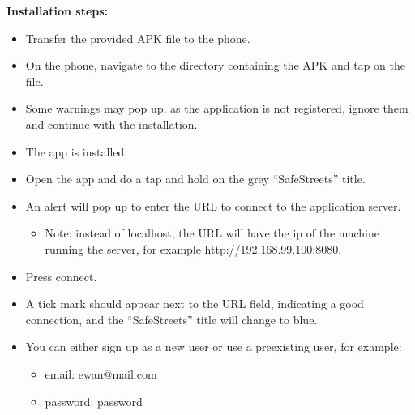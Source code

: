 \textbf{Installation steps:}
\begin{itemize}[label={\textbf{-}}]
    \item 
    Transfer the provided APK file to the phone.
    \item 
    On the phone, navigate to the directory containing the APK and tap on the file.
    \item 
    Some warnings may pop up, as the application is not registered, ignore them and continue with the installation.
    \item 
    The app is installed.
    \item 
    Open the app and do a tap and hold on the grey “SafeStreets” title.
    \item 
    An alert will pop up to enter the URL to connect to the application server.
    \begin{itemize}[label={\textbf{-}}]
        \item Note: instead of localhost, the URL will have the ip of the machine running the server, for example http://192.168.99.100:8080.
    \end{itemize}
    \item Press connect.
    \item A tick mark should appear next to the URL field, indicating a good connection, and the “SafeStreets” title will change to blue.
    \item You can either sign up as a new user or use a preexisting user, for example: 
        \begin{itemize}[label={\textbf{-}}]
            \item email: ewan@mail.com
            \item password: password
        \end{itemize}
\end{itemize}